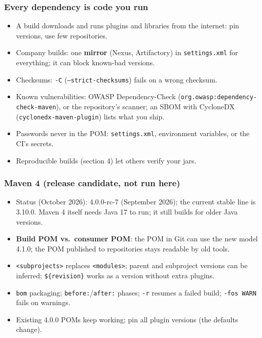 \documentclass[aspectratio=169,10pt,compress]{beamer}
\begin{document}
\begin{frame}[t,fragile] \frametitle{Every dependency is code you run}
  \begin{itemize}\small
    \item A build downloads and runs plugins and libraries from the internet: pin versions, use few repositories.
    \item Company builds: one \textbf{mirror} (Nexus, Artifactory) in \texttt{settings.xml} for everything; it can block known-bad versions.
    \item Checksums: \texttt{-C} (\texttt{--strict-checksums}) fails on a wrong checksum.
    \item Known vulnerabilities: OWASP Dependency-Check (\texttt{org.owasp:dependency-check-maven}), or the repository's scanner; an SBOM with CycloneDX (\texttt{cyclonedx-maven-plugin}) lists what you ship.
    \item Passwords never in the POM: \texttt{settings.xml}, environment variables, or the CI's secrets.
    \item Reproducible builds (section 4) let others verify your jars.
  \end{itemize}
\end{frame}





\begin{frame}[t,fragile] \frametitle{Maven 4 (release candidate, not run here)}
  \begin{itemize}\small
    \item Status (October 2026): 4.0.0-rc-7 (September 2026); the current stable line is 3.10.0. Maven 4 itself needs Java 17 to run; it still builds for older Java versions.
    \item \textbf{Build POM vs.\ consumer POM}: the POM in Git can use the new model 4.1.0; the POM published to repositories stays readable by old tools.
    \item \texttt{<subprojects>} replaces \texttt{<modules>}; parent and subproject versions can be inferred; \texttt{\$\{revision\}} works as a version without extra plugins.
    \item \texttt{bom} packaging; \texttt{before:}/\texttt{after:} phases; \texttt{-r} resumes a failed build; \texttt{-fos WARN} fails on warnings.
    \item Existing 4.0.0 POMs keep working; pin all plugin versions (the defaults change).
  \end{itemize}
\end{frame}
\end{document}
